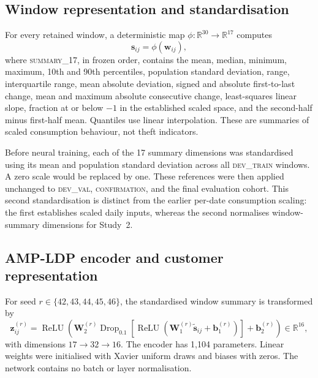\subsection{Window representation and standardisation}

For every retained window, a deterministic map $\phi:\mathbb{R}^{30}\rightarrow\mathbb{R}^{17}$ computes
\begin{equation}
  \mathbf{s}_{ij}=\phi(\mathbf{w}_{ij}),
  \label{eq:summary17}
\end{equation}
where \textsc{summary\_17}, in frozen order, contains the mean, median, minimum, maximum, 10th and 90th percentiles, population standard deviation, range, interquartile range, mean absolute deviation, signed and absolute first-to-last change, mean and maximum absolute consecutive change, least-squares linear slope, fraction at or below $-1$ in the established scaled space, and the second-half minus first-half mean. Quantiles use linear interpolation. These are summaries of scaled consumption behaviour, not theft indicators.

Before neural training, each of the 17 summary dimensions was standardised using its mean and population standard deviation across all \textsc{dev\_train} windows. A zero scale would be replaced by one. These references were then applied unchanged to \textsc{dev\_val}, \textsc{confirmation}, and the final evaluation cohort. This second standardisation is distinct from the earlier per-date consumption scaling: the first establishes scaled daily inputs, whereas the second normalises window-summary dimensions for Study~2.

\subsection{AMP-LDP encoder and customer representation}

For seed $r\in\{42,43,44,45,46\}$, the standardised window summary is transformed by
\begin{equation}
  \mathbf{z}_{ij}^{(r)}=\mathop{\mathrm{ReLU}}\!\left(
  \mathbf{W}_{2}^{(r)}\mathop{\mathrm{Drop}}_{0.1}\!\left[
  \mathop{\mathrm{ReLU}}\!\left(\mathbf{W}_{1}^{(r)}\tilde{\mathbf{s}}_{ij}
  +\mathbf{b}_{1}^{(r)}\right)\right]+\mathbf{b}_{2}^{(r)}\right)
  \in\mathbb{R}^{16},
  \label{eq:encoder}
\end{equation}
with dimensions $17\rightarrow32\rightarrow16$. The encoder has 1,104 parameters. Linear weights were initialised with Xavier uniform draws and biases with zeros. The network contains no batch or layer normalisation.


